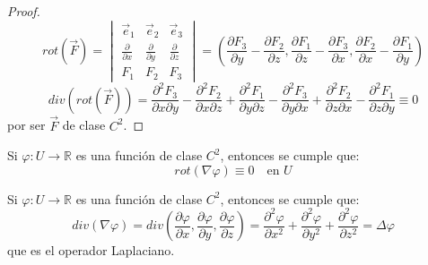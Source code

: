 \begin{proof}
    $$ rot(\vec{F}) = \begin{vmatrix}
        \vec{e}_1 & \vec{e}_2 & \vec{e}_3 \\
        \frac{\partial}{\partial x} & \frac{\partial}{\partial y} & \frac{\partial}{\partial z} \\
        F_1 & F_2 & F_3
    \end{vmatrix} = \left( \frac{\partial F_3}{\partial y} - \frac{\partial F_2}{\partial z}, \frac{\partial F_1}{\partial z} - \frac{\partial F_3}{\partial x}, \frac{\partial F_2}{\partial x} - \frac{\partial F_1}{\partial y} \right)$$
    $$ div(rot(\vec{F})) = \frac{\partial^2 F_3}{\partial x \partial y} - \frac{\partial^2 F_2}{\partial x \partial z} + \frac{\partial^2 F_1}{\partial y \partial z} - \frac{\partial^2 F_3}{\partial y \partial x} + \frac{\partial^2 F_2}{\partial z \partial x} - \frac{\partial^2 F_1}{\partial z \partial y} \equiv 0$$
    por ser $\vec{F}$ de clase $C^2$.
\end{proof}

\begin{observación}
    Si $\varphi : U \to \mathbb{R}$ es una función de clase $C^2$, entonces se cumple que:
    $$ rot(\nabla \varphi) \equiv 0 \quad \text{en } U$$
\end{observación}

\begin{observación}
    Si $\varphi : U \to \mathbb{R}$ es una función de clase $C^2$, entonces se cumple que:
    $$ div(\nabla \varphi) = div\left(\frac{\partial \varphi}{\partial x}, \frac{\partial \varphi}{\partial y}, \frac{\partial \varphi}{\partial z}\right) = \frac{\partial^2 \varphi}{\partial x^2} + \frac{\partial^2 \varphi}{\partial y^2} + \frac{\partial^2 \varphi}{\partial z^2} = \Delta \varphi$$
    que es el operador Laplaciano.
\end{observación}

